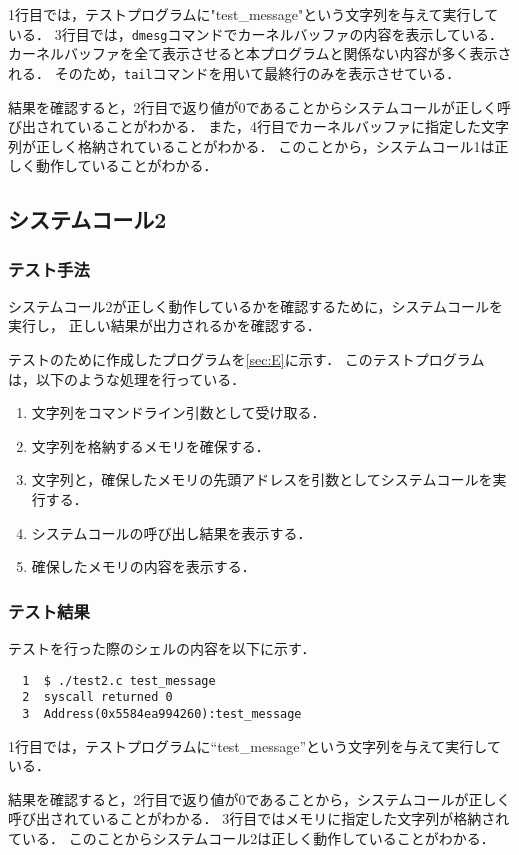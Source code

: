 \documentclass[12pt]{jsarticle}
\begin{document}
1行目では，テストプログラムに"test\_message"という文字列を与えて実行している．
3行目では，\verb|dmesg|コマンドでカーネルバッファの内容を表示している．
カーネルバッファを全て表示させると本プログラムと関係ない内容が多く表示される．
そのため，\verb|tail|コマンドを用いて最終行のみを表示させている．

結果を確認すると，2行目で返り値が0であることからシステムコールが正しく呼び出されていることがわかる．
また，4行目でカーネルバッファに指定した文字列が正しく格納されていることがわかる．
このことから，システムコール1は正しく動作していることがわかる．

\subsection{システムコール2}

\subsubsection{テスト手法}
システムコール2が正しく動作しているかを確認するために，システムコールを実行し，
正しい結果が出力されるかを確認する．

テストのために作成したプログラムを\ref{sec:E}に示す．
このテストプログラムは，以下のような処理を行っている．
\begin{enumerate}
  \item 文字列をコマンドライン引数として受け取る．
  \item 文字列を格納するメモリを確保する．
  \item 文字列と，確保したメモリの先頭アドレスを引数としてシステムコールを実行する．
  \item システムコールの呼び出し結果を表示する．
  \item 確保したメモリの内容を表示する．
\end{enumerate}


\subsubsection{テスト結果}

テストを行った際のシェルの内容を以下に示す．
\begin{verbatim}
  1  $ ./test2.c test_message
  2  syscall returned 0
  3  Address(0x5584ea994260):test_message
\end{verbatim}

1行目では，テストプログラムに“test\_message”という文字列を与えて実行している．

結果を確認すると，2行目で返り値が0であることから，システムコールが正しく呼び出されていることがわかる．
3行目ではメモリに指定した文字列が格納されている．
このことからシステムコール2は正しく動作していることがわかる．　
\end{document}
